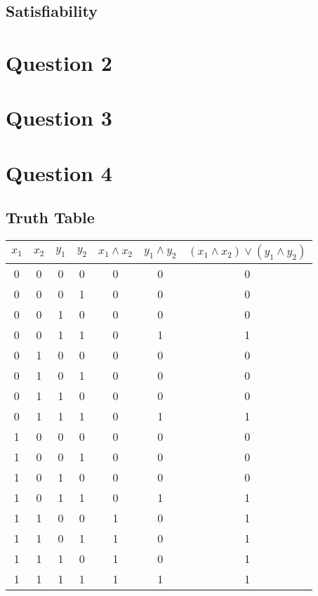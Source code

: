 \documentclass[a4paper,10pt]{article}
\begin{document}
\subsection*{Satisfiability}


\section*{Question 2}
\section*{Question 3}
\section*{Question 4}
\subsection*{Truth Table}
\begin{tabular}{|c|c|c|c|c|c|c|}
\hline
$x_1$ & $x_2$ & $y_1$ & $y_2$ & $x_1 \wedge x_2 $ & $y_1 \wedge y_2$ & $(x_1 \wedge x_2) \vee (y_1 \wedge y_2)$ \\
\hline
0 & 0 & 0 & 0 & 0 & 0 & 0 \\
0 & 0 & 0 & 1 & 0 & 0 & 0 \\
0 & 0 & 1 & 0 & 0 & 0 & 0 \\
0 & 0 & 1 & 1 & 0 & 1 & 1 \\
0 & 1 & 0 & 0 & 0 & 0 & 0 \\
0 & 1 & 0 & 1 & 0 & 0 & 0 \\
0 & 1 & 1 & 0 & 0 & 0 & 0 \\
0 & 1 & 1 & 1 & 0 & 1 & 1 \\
1 & 0 & 0 & 0 & 0 & 0 & 0 \\
1 & 0 & 0 & 1 & 0 & 0 & 0 \\
1 & 0 & 1 & 0 & 0 & 0 & 0 \\
1 & 0 & 1 & 1 & 0 & 1 & 1 \\
1 & 1 & 0 & 0 & 1 & 0 & 1 \\
1 & 1 & 0 & 1 & 1 & 0 & 1 \\
1 & 1 & 1 & 0 & 1 & 0 & 1 \\
1 & 1 & 1 & 1 & 1 & 1 & 1 \\

\hline
\end{tabular}
\end{document}
